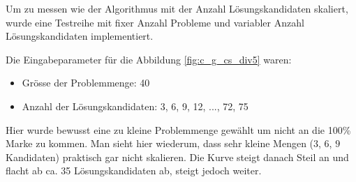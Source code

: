 Um zu messen wie der Algorithmus mit der Anzahl Lösungskandidaten skaliert, wurde eine Testreihe mit fixer Anzahl Probleme und variabler Anzahl Lösungskandidaten implementiert.

Die Eingabeparameter für die Abbildung \ref{fig:c_g_cs_div5} waren:
\begin{itemize}
	\item Grösse der Problemmenge: 40
	\item Anzahl der Lösungskandidaten: 3, 6, 9, 12, ..., 72, 75
\end{itemize}

Hier wurde bewusst eine zu kleine Problemmenge gewählt um nicht an die 100\% Marke zu kommen. Man sieht hier wiederum, dass sehr kleine Mengen ($3$, $6$, $9$ Kandidaten) praktisch gar nicht skalieren. Die Kurve steigt danach Steil an und flacht ab ca. 35 Lösungskandidaten ab, steigt jedoch weiter.
